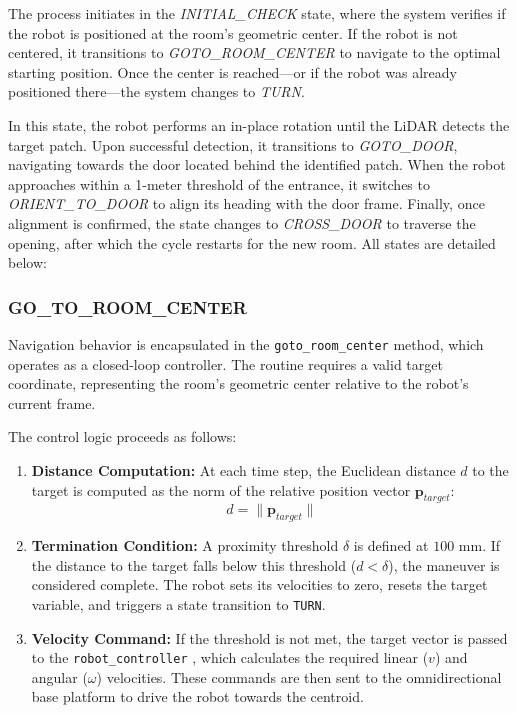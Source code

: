 \documentclass[conference]{IEEEtran}
\begin{document}
    The process initiates in the \textit{INITIAL\_CHECK} state, where the system verifies if the robot is positioned at the room's geometric center. If the robot is not centered, it transitions to \textit{GOTO\_ROOM\_CENTER} to navigate to the optimal starting position. Once the center is reached—or if the robot was already positioned there—the system changes to \textit{TURN}.
    
    In this state, the robot performs an in-place rotation until the LiDAR detects the target patch. Upon successful detection, it transitions to \textit{GOTO\_DOOR}, navigating towards the door located behind the identified patch. When the robot approaches within a 1-meter threshold of the entrance, it switches to \textit{ORIENT\_TO\_DOOR} to align its heading with the door frame. Finally, once alignment is confirmed, the state changes to \textit{CROSS\_DOOR} to traverse the opening, after which the cycle restarts for the new room.
    \vspace{0.5cm} All states are detailed below:


    \subsubsection{GO\_TO\_ROOM\_CENTER} Navigation behavior is encapsulated in the \texttt{goto\_room\_center} method, which operates as a closed-loop controller. The routine requires a valid target coordinate, representing the room's geometric center relative to the robot's current frame.
    
    The control logic proceeds as follows:
    \begin{enumerate}
        \item \textbf{Distance Computation:} At each time step, the Euclidean distance $d$ to the target is computed as the norm of the relative position vector $\mathbf{p}_{target}$:
        \begin{equation}
            d = \|\mathbf{p}_{target}\|
        \end{equation}
        \item \textbf{Termination Condition:} A proximity threshold $\delta$ is defined at $100$ mm. If the distance to the target falls below this threshold ($d < \delta$), the maneuver is considered complete. The robot sets its velocities to zero, resets the target variable, and triggers a state transition to \texttt{TURN}.
        
        \item \textbf{Velocity Command:} If the threshold is not met, the target vector is passed to the \texttt{robot\_controller} \cite{siegwart2011intro}, which calculates the required linear ($v$) and angular ($\omega$) velocities. These commands are then sent to the omnidirectional base platform to drive the robot towards the centroid.
    \end{enumerate}
\end{document}
